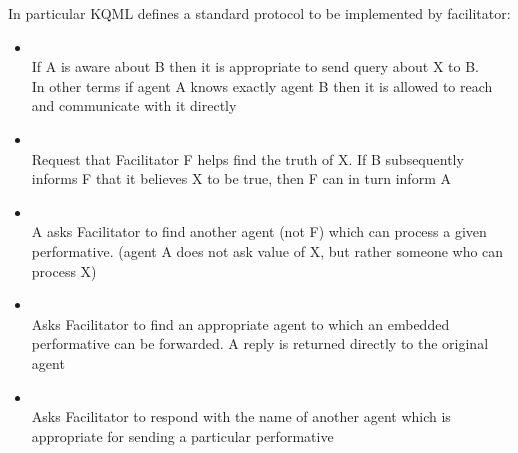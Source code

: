 In particular KQML defines a standard protocol to be implemented by facilitator:
\begin{itemize}
\item {} \\
If A is aware about B then it is appropriate to send query about X to B.\\
In other terms if agent A knows exactly agent B then it is allowed to reach and communicate with it directly
\item {}\\
Request that Facilitator F helps find the truth of X. If B subsequently informs F that it believes X to be true, then F can in turn inform A
\item {}\\
A asks Facilitator to find another agent (not F) which can process a given performative. (agent A does not ask value of X, but rather someone who can process X)
\item {}\\
Asks Facilitator to find an appropriate agent to which an embedded performative can be forwarded. A reply is returned directly to the original agent
\item {}\\
Asks Facilitator to respond with the name of another agent which is appropriate for sending a particular performative 
\end{itemize}

